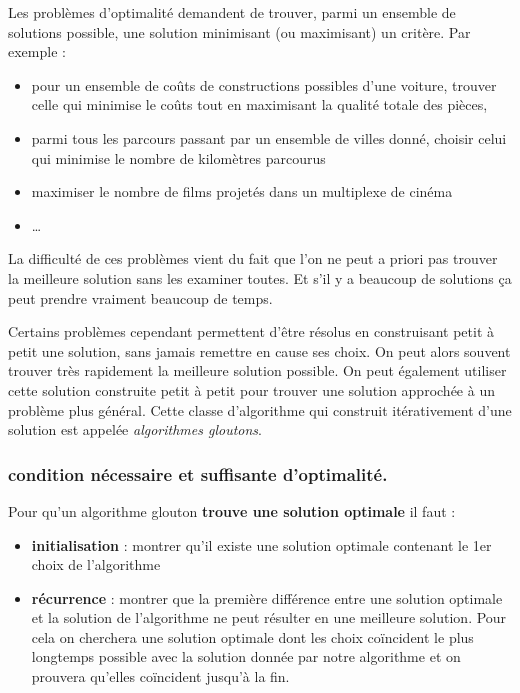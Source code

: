\documentclass[
]{article}
\providecommand{\tightlist}{%
  \setlength{\itemsep}{0pt}\setlength{\parskip}{0pt}}
\begin{document}
Les problèmes d'optimalité demandent de trouver, parmi un ensemble de
solutions possible, une solution minimisant (ou maximisant) un critère.
Par exemple :

\begin{itemize}
\tightlist
\item
  pour un ensemble de coûts de constructions possibles d'une voiture,
  trouver celle qui minimise le coûts tout en maximisant la qualité
  totale des pièces,
\item
  parmi tous les parcours passant par un ensemble de villes donné,
  choisir celui qui minimise le nombre de kilomètres parcourus
\item
  maximiser le nombre de films projetés dans un multiplexe de cinéma
\item
  \ldots{}
\end{itemize}

La difficulté de ces problèmes vient du fait que l'on ne peut a priori
pas trouver la meilleure solution sans les examiner toutes. Et s'il y a
beaucoup de solutions ça peut prendre vraiment beaucoup de temps.

Certains problèmes cependant permettent d'être résolus en construisant
petit à petit une solution, sans jamais remettre en cause ses choix. On
peut alors souvent trouver très rapidement la meilleure solution
possible. On peut également utiliser cette solution construite petit à
petit pour trouver une solution approchée à un problème plus général.
Cette classe d'algorithme qui construit itérativement d'une solution est
appelée \emph{algorithmes gloutons}.

\hypertarget{condition-nuxe9cessaire-et-suffisante-doptimalituxe9.}{%
\subsubsection{condition nécessaire et suffisante
d'optimalité.}\label{condition-nuxe9cessaire-et-suffisante-doptimalituxe9.}}

Pour qu'un algorithme glouton \textbf{trouve une solution optimale} il
faut :

\begin{itemize}
\tightlist
\item
  \textbf{initialisation} : montrer qu'il existe une solution optimale
  contenant le 1er choix de l'algorithme
\item
  \textbf{récurrence} : montrer que la première différence entre une
  solution optimale et la solution de l'algorithme ne peut résulter en
  une meilleure solution. Pour cela on cherchera une solution optimale
  dont les choix coïncident le plus longtemps possible avec la solution
  donnée par notre algorithme et on prouvera qu'elles coïncident jusqu'à
  la fin.
\end{itemize}
\end{document}

